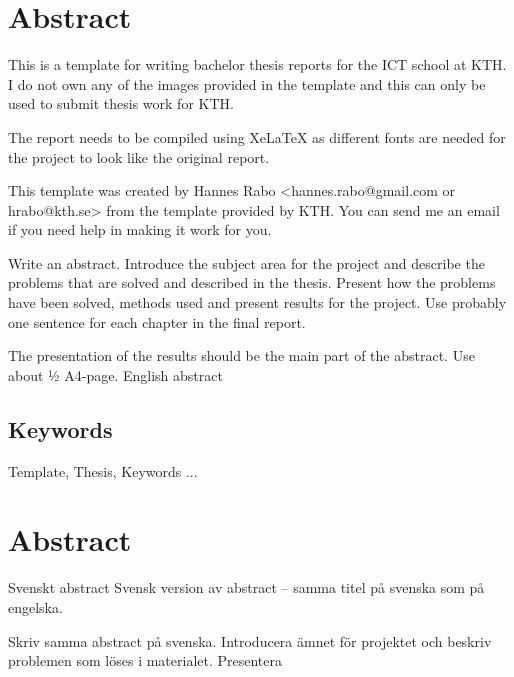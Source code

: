 \newpage

\section*{Abstract}

This is a template for writing bachelor thesis reports for the ICT school at KTH. I do not own any of the images provided in the template and this can only be used to submit thesis work for KTH.

The report needs to be compiled using XeLaTeX as different fonts are needed for the project to look like the original report.

This template was created by Hannes Rabo <hannes.rabo@gmail.com or hrabo@kth.se> from the template provided by KTH. You can send me an email if you need help in making it work for you.


\vspace{2cm}
Write an abstract. Introduce the subject area for the project and describe the problems that are solved and described in the thesis. Present how the problems have been solved, methods used and present results for the project. Use probably one sentence for each chapter in the final report.

The presentation of the results should be the main part of the abstract. Use about ½ A4-page.
English abstract




\subsection*{Keywords}
Template, Thesis, Keywords ...






\newpage
\section*{Abstract}
Svenskt abstract
Svensk version av abstract – samma titel på svenska som på engelska.

Skriv samma abstract på svenska. Introducera ämnet för projektet och beskriv problemen som löses i materialet. Presentera 

